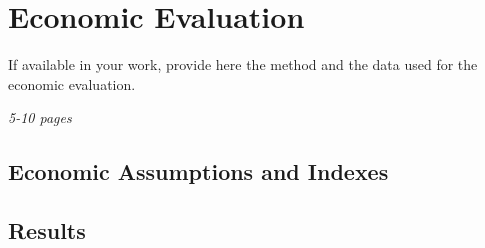 \newpage
\chapter{Economic Evaluation}
If available in your work, provide here the method and the data used for the economic evaluation.

\textit{5-10 pages}

\section{Economic Assumptions and Indexes}
\section{Results}